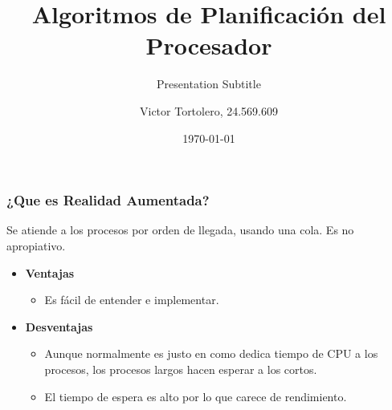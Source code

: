 \documentclass{beamer}
\title{Algoritmos de Planificación del Procesador}
\subtitle{Presentation Subtitle} %
\author{Victor Tortolero, 24.569.609}
\institute{
	Sistemas Operativos, FACYT
}
\date{\today}
\begin{document}
	\frame{\maketitle}
	
		
		
		\begin{frame}
			\frametitle{\algTitle ¿Que es Realidad Aumentada?}
			Se atiende a los procesos por orden de llegada, usando una cola. Es no apropiativo.
			
			\begin{itemize}
				\item \textbf{Ventajas}
				\begin{itemize}
					\item Es fácil de entender e implementar.
				\end{itemize}
				\vspace{0.5cm}
				
				\item \textbf{Desventajas}
				\begin{itemize}
					\item Aunque normalmente es justo en como dedica tiempo de CPU a los procesos,
					los procesos largos hacen esperar a los cortos.
					\item El tiempo de espera es alto por lo que carece de rendimiento.
				\end{itemize}
			\end{itemize}
		\end{frame}
	
\end{document}
